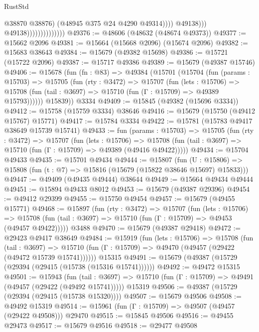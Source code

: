 \begin{lexlean}{RustStd}
\begin{coremodule}
                                              @38870
                                              @38876)
                                            (@48945 @375 @24 @4290 @49314))))
                                      @49138)))
                                @49138))))))))))))))
@49376 := @48606 (@48632 (@48674 @49373))
@49377 := @15662 @2096
@49381 := @15664 (@15668 @2096) (@15674 @2096)
@49382 := @15683 @38643
@49384 := @15679 (@49382 @15698)
@49386 := @15721 (@15722 @2096)
@49387 := @15717 @49386
@49389 := @15679 (@49387 @15746)
@49406 := @15678
    (fun (fn : @83) =>
    @49384
      (@15701
        (@15704
          (fun (params : @15703) =>
          @15705
            (fun (rty : @3472) =>
            @15707
              (fun (lets : @15706) =>
              @15708 (fun (tail : @3697) => @15710 (fun (Γ : @15709) => @49389 @15793))))))
        @15839))
    @3334
@49409 := @15845 (@49382 (@15696 @3334))
@49412 := @15758 (@15759 @3334) @38646
@49416 := @15679 (@15750 (@49412 @15767) @15771)
@49417 := @15784 @3334
@49422 := @15781 (@15783 @49417 @38649 @15739 @15741)
@49433 := fun (params : @15703) =>
  @15705
    (fun (rty : @3472) =>
    @15707
      (fun (lets : @15706) =>
      @15708 (fun (tail : @3697) => @15710 (fun (Γ : @15709) => @49389 (@49416 @49422)))))
@49434 := @15704 @49433
@49435 := @15701 @49434
@49444 := @15807
    (fun (U : @15806) => @15808 (fun (t : @7) => @15816 (@15679 (@15822 @38646 @15697) @15833)))
@49447 := @49409 (@49435 @49444) @38644
@49449 := @15664 @49434 @49444
@49451 := @15894 @49433 @8012
@49453 := @15679 (@49387 @29396)
@49454 := @49412 @29399
@49455 := @15750 @49454
@49457 := @15679 (@49455 @15771)
@49468 := @15897
    (fun (rty : @3472) =>
    @15707
      (fun (lets : @15706) =>
      @15708 (fun (tail : @3697) => @15710 (fun (Γ : @15709) => @49453 (@49457 @49422)))))
    @3488
@49470 := @15679 (@49387 @29418)
@49472 := @29423 @49417 @38649
@49484 := @15919
    (fun (lets : @15706) =>
    @15708
      (fun (tail : @3697) =>
      @15710 (fun (Γ : @15709) => @49470 (@49457 (@29422 (@49472 @15739 @15741))))))
    @15315
@49491 := @15679 (@49387 (@15729 (@29394 (@29415 (@15738 (@15316 @15741))))))
@49492 := @49472 @15315
@49501 := @15943
    (fun (tail : @3697) => @15710 (fun (Γ : @15709) => @49491 (@49457 (@29422 (@49492 @15741)))))
    @15319
@49506 := @49387 (@15729 (@29394 (@29415 (@15738 @15320))))
@49507 := @15679 @49506
@49508 := @49492 @15319
@49514 := @15961 (fun (Γ : @15709) => @49507 (@49457 (@29422 @49508))) @29470
@49515 := @15845 @49506
@49516 := @49455 @29473
@49517 := @15679 @49516
@49518 := @29477 @49508

\end{coremodule}
\end{lexlean}

